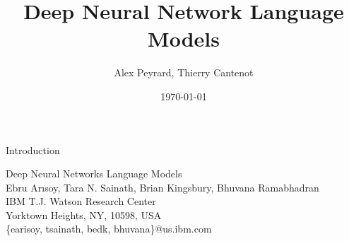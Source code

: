 \documentclass{beamer}
\title[DNNLM]{Deep Neural Network Language Models}
\author[A. Peyrard, T. Cantenot]{Alex Peyrard, Thierry Cantenot}
\institute{Shanghai JiaoTong University}
\date{\today}
\begin{document}
\begin{frame}[plain]
	  \titlepage
\end{frame}
\begin{frame}{Introduction}
\begin{center}
Deep Neural Networks Language Models\\
Ebru Arısoy, Tara N. Sainath, Brian Kingsbury, Bhuvana Ramabhadran\\
IBM T.J. Watson Research Center\\
Yorktown Heights, NY, 10598, USA\\
\{earisoy, tsainath, bedk, bhuvana\}@us.ibm.com
\end{center}
\end{frame}
\begin{frame}

\end{frame}
\end{document}
